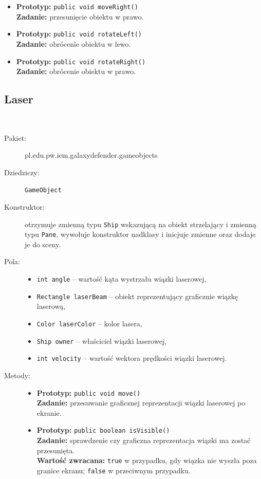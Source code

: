 \documentclass[a4paper]{article}
\newcommand{\prog}{\texttt}
\begin{document}
\begin{description}
\begin{itemize}
        \item \textbf{Prototyp:} \prog{public void moveRight()}\\\textbf{Zadanie:} przesunięcie obiektu w prawo.
        \item \textbf{Prototyp:} \prog{public void rotateLeft()}\\\textbf{Zadanie:} obrócenie obiektu w lewo.
        \item \textbf{Prototyp:} \prog{public void rotateRight()}\\\textbf{Zadanie:} obrócenie obiektu w prawo.
    \end{itemize}
\end{description}

\subsection{Laser}\
\begin{description}
    \item[Pakiet:] pl.edu.pw.iem.galaxydefender.gameobjects
    \item[Dziedziczy:] \prog{GameObject}
    \item[Konstruktor:] otrzymuje zmienną typu \prog{Ship} wskazującą na obiekt strzelający i zmienną typu \prog{Pane}, wywołuje konstruktor nadklasy i inicjuje zmienne oraz dodaje je do sceny.
    \item[Pola:] \hfill
    \begin{itemize}
        \item \prog{int angle} -- wartość kąta wystrzału wiązki laserowej,
        \item \prog{Rectangle laserBeam} -- obiekt reprezentujący graficznie wiązkę laserową,
        \item \prog{Color laserColor} -- kolor lasera,
        \item \prog{Ship owner} -- właściciel wiązki laserowej,
        \item \prog{int velocity} -- wartość wektora prędkości wiązki laserowej.
    \end{itemize}
    \item[Metody:] \hfill
    \begin{itemize}
        \item \textbf{Prototyp:} \prog{public void move()}\\\textbf{Zadanie:} przesuwanie graficznej reprezentacji wiązki laserowej po ekranie.
        \item \textbf{Prototyp:} \prog{public boolean isVisible()}\\\textbf{Zadanie:} sprawdzenie czy graficzna reprezentacja wiązki ma zostać przesunięta.\\\textbf{Wartość zwracana:} \prog{true} w przypadku, gdy wiązka nie wyszła poza granice ekranu; \prog{false} w przeciwnym przypadku.
    \end{itemize}
\end{description}
\end{document}
